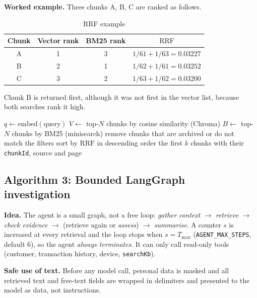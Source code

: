 \documentclass[oneside,a4paper,12pt]{report}
\begin{document}
\textbf{Worked example.} Three chunks A, B, C are ranked as follows.
\begin{table}[H]
\centering
\begin{tabular}{|c|c|c|c|}
\hline
Chunk & Vector rank & BM25 rank & $\mathrm{RRF}$ \\ \hline
A & 1 & 3 & $1/61 + 1/63 = 0.03227$ \\ \hline
B & 2 & 1 & $1/62 + 1/61 = 0.03252$ \\ \hline
C & 3 & 2 & $1/63 + 1/62 = 0.03200$ \\ \hline
\end{tabular}
\caption{RRF example}
\end{table}
Chunk B is returned first, although it was not first in the vector list, because both searches rank it high.

\begin{algorithm}[H]
\DontPrintSemicolon
\caption{\texttt{searchKb(query, filters, k)}}
$q \leftarrow \mathrm{embed}(\text{query})$\;
$V \leftarrow$ top-$N$ chunks by cosine similarity (Chroma)\;
$B \leftarrow$ top-$N$ chunks by BM25 (minisearch)\;
remove chunks that are archived or do not match the filters\;
sort by $\mathrm{RRF}$ in descending order\;
\Return the first $k$ chunks with their \texttt{chunkId}, source and page\;
\end{algorithm}

\subsection{Algorithm 3: Bounded LangGraph investigation}
\textbf{Idea.} The agent is a small graph, not a free loop: \emph{gather context} $\rightarrow$ \emph{retrieve} $\rightarrow$ \emph{check evidence} $\rightarrow$ (retrieve again or \emph{assess}) $\rightarrow$ \emph{summarise}. A counter $s$ is increased at every retrieval and the loop stops when $s = T_{\max}$ (\texttt{AGENT\_MAX\_STEPS}, default 6), so the agent \emph{always terminates}. It can only call read-only tools (customer, transaction history, device, \texttt{searchKb}).

\textbf{Safe use of text.} Before any model call, personal data is masked and all retrieved text and free-text fields are wrapped in delimiters and presented to the model as data, not instructions.
\end{document}
